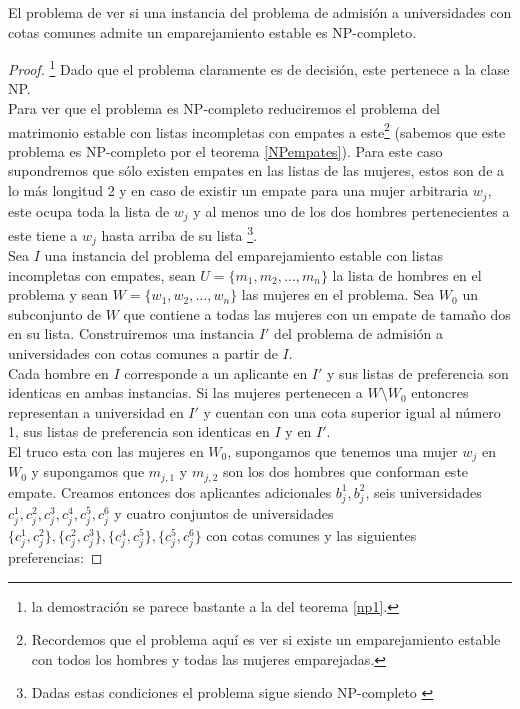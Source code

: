 \begin{teo}  \cite{Todo}
El problema de ver si una instancia del problema de admisión a universidades con cotas comunes admite un emparejamiento estable es NP-completo. 
\end{teo}
\begin{proof}
\footnote{la demostración se parece bastante a la del teorema \ref{np1}.}
Dado que el problema claramente es de decisión, este pertenece a la clase NP. \\ Para ver que el problema es NP-completo reduciremos el problema del matrimonio estable con listas incompletas con empates a este\footnote{Recordemos que el problema aquí es ver si existe un emparejamiento estable con todos los hombres y todas las mujeres emparejadas.} (sabemos que este problema es NP-completo por el teorema \ref{NPempates}). Para este caso supondremos que sólo existen empates en las listas de las mujeres, estos son de a lo más longitud 2 y en caso de existir un empate para una mujer arbitraria $w_j$, este ocupa toda la lista de $w_j$ y al menos uno de los dos hombres pertenecientes a este tiene a $w_j$ hasta arriba de su lista \footnote{Dadas estas condiciones el problema sigue siendo NP-completo \cite{empates}}. \\
Sea $I$ una instancia del problema del emparejamiento estable con listas incompletas con empates, sean $U=\{m_1,m_2,\dots,m_n\}$ la lista de hombres en el problema y sean $W=\{w_1,w_2,\dots,w_n\}$ las mujeres en el problema.  Sea $W_0$ un subconjunto de $W$ que contiene a todas las mujeres con un empate de tamaño dos en su lista.  Construiremos una instancia $I'$ del problema de admisión a universidades con cotas comunes a partir de $I$.  \\
Cada hombre en $I$ corresponde a un aplicante en $I'$ y sus listas de preferencia son identicas en ambas instancias. Si las mujeres pertenecen a $W \setminus W_0$ entoncres representan a universidad en $I'$ y cuentan con una cota superior igual al número 1, sus listas de preferencia son identicas en $I$ y en $I'$.  \\
El truco esta con las mujeres en $W_0$, supongamos que tenemos una mujer $w_j$ en $W_0$ y supongamos que $m_{j,1}$ y $m_{j,2}$ son los dos hombres que conforman este empate. Creamos entonces dos aplicantes adicionales $b_j^1,b_j^2$, seis universidades $c_j^1,c_j^2,c_j^3,c_j^4,c_j^5,c_j^6$ y cuatro conjuntos de universidades $\{c_j^1,c_j^2\},\{c_j^2,c_j^3\},\{c_j^4,c_j^5\},\{c_j^5,c_j^6\}$ con cotas comunes y las siguientes preferencias: 


\end{proof}
